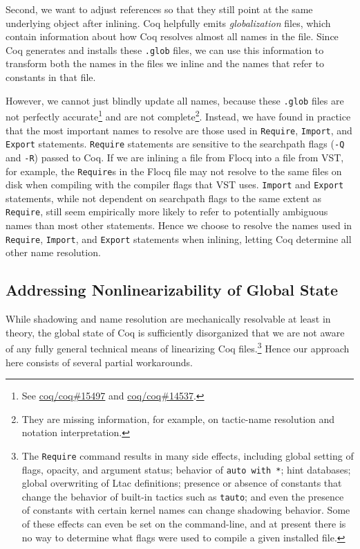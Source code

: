 \documentclass[a4paper,USenglish,cleveref,autoref,thm-restate]{lipics-v2021}
\newcommand{\coqbug}[1]{\href{https://github.com/coq/coq/issues/#1}{coq/coq\##1}}
\begin{document}
Second, we want to adjust references so that they still point at the same underlying object after inlining.
Coq helpfully emits \emph{globalization} files, which contain information about how Coq resolves almost all names in the file.
Since Coq generates and installs these \texttt{.glob} files, we can use this information to transform both the names in the files we inline and the names that refer to constants in that file.

However, we cannot just blindly update all names, because these \texttt{.glob} files are not perfectly accurate\footnote{See \coqbug{15497} and \coqbug{14537}.} and are not complete\footnote{They are missing information, for example, on tactic-name resolution and notation interpretation.}.
Instead, we have found in practice that the most important names to resolve are those used in \texttt{Require}, \texttt{Import}, and \texttt{Export} statements.
\texttt{Require} statements are sensitive to the searchpath flags (\verb|-Q| and \verb|-R|) passed to Coq.
If we are inlining a file from Flocq into a file from VST, for example, the \texttt{Require}s in the Flocq file may not resolve to the same files on disk when compiling with the compiler flags that VST uses.
\texttt{Import} and \texttt{Export} statements, while not dependent on searchpath flags to the same extent as \texttt{Require}, still seem empirically more likely to refer to potentially ambiguous names than most other statements.
Hence we choose to resolve the names used in \texttt{Require}, \texttt{Import}, and \texttt{Export} statements when inlining, letting Coq determine all other name resolution.

\subsection{Addressing Nonlinearizability of Global State}\label{sec:linearize-global-state}
While shadowing and name resolution are mechanically resolvable at least in theory, the global state of Coq is sufficiently disorganized that we are not aware of any fully general technical means of linearizing Coq files.\footnote{%
The \texttt{Require} command results in many side effects, including global setting of flags, opacity, and argument status; behavior of \texttt{auto with *}; hint databases; global overwriting of Ltac definitions; presence or absence of constants that change the behavior of built-in tactics such as \texttt{tauto}; and even the presence of constants with certain kernel names can change shadowing behavior.
Some of these effects can even be set on the command-line, and at present there is no way to determine what flags were used to compile a given installed file.
}
Hence our approach here consists of several partial workarounds.
\end{document}

